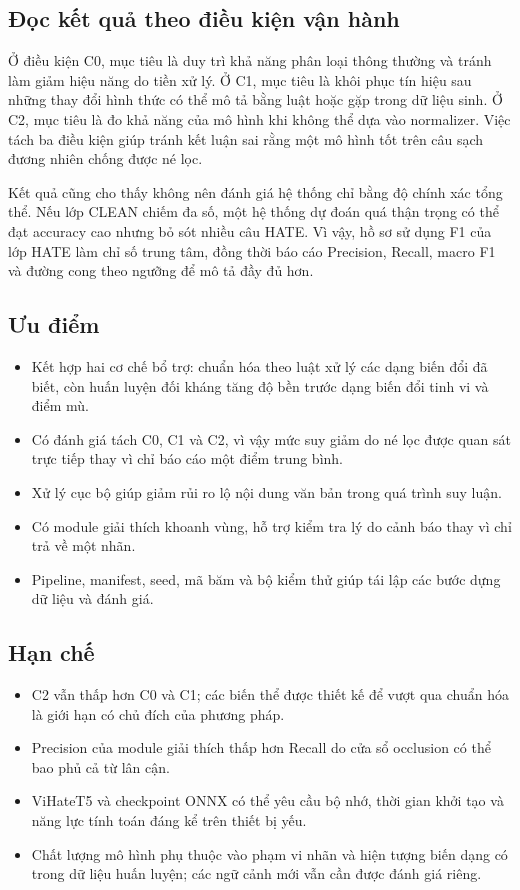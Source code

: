 \documentclass[12pt,a4paper]{article}
\begin{document}
\subsection{Đọc kết quả theo điều kiện vận hành}
Ở điều kiện C0, mục tiêu là duy trì khả năng phân loại thông thường và tránh làm giảm hiệu năng do tiền xử lý. Ở C1, mục tiêu là khôi phục tín hiệu sau những thay đổi hình thức có thể mô tả bằng luật hoặc gặp trong dữ liệu sinh. Ở C2, mục tiêu là đo khả năng của mô hình khi không thể dựa vào normalizer. Việc tách ba điều kiện giúp tránh kết luận sai rằng một mô hình tốt trên câu sạch đương nhiên chống được né lọc.

Kết quả cũng cho thấy không nên đánh giá hệ thống chỉ bằng độ chính xác tổng thể. Nếu lớp CLEAN chiếm đa số, một hệ thống dự đoán quá thận trọng có thể đạt accuracy cao nhưng bỏ sót nhiều câu HATE. Vì vậy, hồ sơ sử dụng F1 của lớp HATE làm chỉ số trung tâm, đồng thời báo cáo Precision, Recall, macro F1 và đường cong theo ngưỡng để mô tả đầy đủ hơn.

\subsection{Ưu điểm}
\begin{itemize}
  \item Kết hợp hai cơ chế bổ trợ: chuẩn hóa theo luật xử lý các dạng biến đổi đã biết, còn huấn luyện đối kháng tăng độ bền trước dạng biến đổi tinh vi và điểm mù.
  \item Có đánh giá tách C0, C1 và C2, vì vậy mức suy giảm do né lọc được quan sát trực tiếp thay vì chỉ báo cáo một điểm trung bình.
  \item Xử lý cục bộ giúp giảm rủi ro lộ nội dung văn bản trong quá trình suy luận.
  \item Có module giải thích khoanh vùng, hỗ trợ kiểm tra lý do cảnh báo thay vì chỉ trả về một nhãn.
  \item Pipeline, manifest, seed, mã băm và bộ kiểm thử giúp tái lập các bước dựng dữ liệu và đánh giá.
\end{itemize}

\subsection{Hạn chế}
\begin{itemize}
  \item C2 vẫn thấp hơn C0 và C1; các biến thể được thiết kế để vượt qua chuẩn hóa là giới hạn có chủ đích của phương pháp.
  \item Precision của module giải thích thấp hơn Recall do cửa sổ occlusion có thể bao phủ cả từ lân cận.
  \item ViHateT5 và checkpoint ONNX có thể yêu cầu bộ nhớ, thời gian khởi tạo và năng lực tính toán đáng kể trên thiết bị yếu.
  \item Chất lượng mô hình phụ thuộc vào phạm vi nhãn và hiện tượng biến dạng có trong dữ liệu huấn luyện; các ngữ cảnh mới vẫn cần được đánh giá riêng.
\end{itemize}
\end{document}
